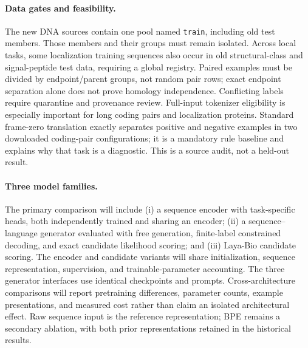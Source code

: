 \paragraph{Data gates and feasibility.}
The new DNA sources contain one pool named \texttt{train}, including old test members. Those members and their groups must remain isolated. Across local tasks, some localization training sequences also occur in old structural-class and signal-peptide test data, requiring a global registry. Paired examples must be divided by endpoint/parent groups, not random pair rows; exact endpoint separation alone does not prove homology independence. Conflicting labels require quarantine and provenance review. Full-input tokenizer eligibility is especially important for long coding pairs and localization proteins. Standard frame-zero translation exactly separates positive and negative examples in two downloaded coding-pair configurations; it is a mandatory rule baseline and explains why that task is a diagnostic. This is a source audit, not a held-out result.

\paragraph{Three model families.}
The primary comparison will include (i) a sequence encoder with task-specific heads, both independently trained and sharing an encoder; (ii) a sequence--language generator evaluated with free generation, finite-label constrained decoding, and exact candidate likelihood scoring; and (iii) Laya-Bio candidate scoring. The encoder and candidate variants will share initialization, sequence representation, supervision, and trainable-parameter accounting. The three generator interfaces use identical checkpoints and prompts. Cross-architecture comparisons will report pretraining differences, parameter counts, example presentations, and measured cost rather than claim an isolated architectural effect. Raw sequence input is the reference representation; BPE remains a secondary ablation, with both prior representations retained in the historical results.

